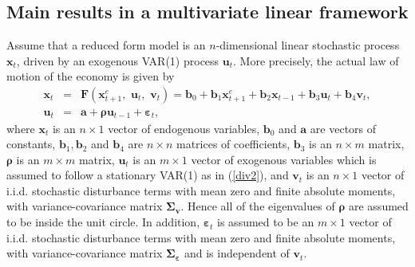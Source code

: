 \subsection{Main results in a multivariate linear framework}\label{sec:lin}
Assume that a reduced form model is an $n$-dimensional linear stochastic process $\pmb x_t$, driven by an
exogenous VAR(1) process $\pmb u_t$. More precisely, the actual law of
motion of the economy is given by
\begin{eqnarray}
{\pmb x}_t&=&\pmb{F}( {\pmb x}_{t+1}^e, \,\, {\pmb u}_t, \,\, {\pmb v}_t)={\pmb b}_0+{\pmb b}_1{\pmb x}_{t+1}^e+ {\pmb b}_2{\pmb x}_{t-1}+{\pmb b}_3{\pmb u}_t + {\pmb b}_4{\pmb v}_t,\label{xf1}\\
\pmb{u}_t&=&\pmb{a}+\pmb{\rho}\pmb{u}_{t-1}+{\pmb\varepsilon}_t, \label{div2}
\end{eqnarray}
where ${\pmb x}_t$ is an $n\times1$ vector of endogenous variables, ${\pmb b}_0$ and $\pmb{a}$ are vectors of constants, ${\pmb b}_1, {\pmb b}_2$ and ${\pmb b}_4$ are $n\times n$ matrices of coefficients,  ${\pmb b}_3$ is an $n\times m$ matrix, ${\pmb \rho}$ is an $m\times m$ matrix, ${\pmb u}_t$ is an $m\times 1$ vector of exogenous variables which is assumed to follow a stationary VAR(1) as  in (\ref{div2}), and ${\pmb v}_t$ is an $n\times 1$ vector of i.i.d. stochastic disturbance terms with mean
zero and finite absolute moments, with variance-covariance matrix
$\pmb{\Sigma_{\pmb v}}$. Hence all of the eigenvalues of $\pmb\rho$ are assumed to be inside the unit circle. %
In addition, ${\pmb\varepsilon}_t$ is assumed to be an $m\times 1$ vector of i.i.d. stochastic disturbance terms with mean
zero and finite absolute moments, with variance-covariance matrix
$\pmb{\Sigma_\varepsilon}$ and is independent of ${{\pmb v}_t}$.

